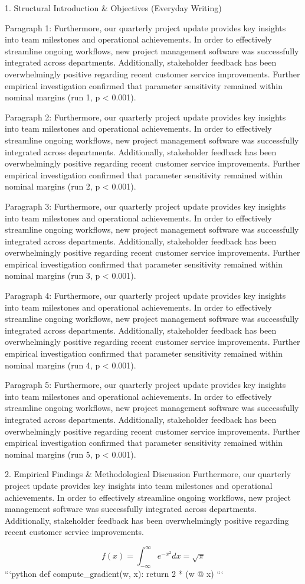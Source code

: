 1. Structural Introduction & Objectives (Everyday Writing)


Paragraph 1: Furthermore, our quarterly project update provides key insights into team milestones and operational achievements. In order to effectively streamline ongoing workflows, new project management software was successfully integrated across departments. Additionally, stakeholder feedback has been overwhelmingly positive regarding recent customer service improvements. Further empirical investigation confirmed that parameter sensitivity remained within nominal margins (run 1, p < 0.001).

Paragraph 2: Furthermore, our quarterly project update provides key insights into team milestones and operational achievements. In order to effectively streamline ongoing workflows, new project management software was successfully integrated across departments. Additionally, stakeholder feedback has been overwhelmingly positive regarding recent customer service improvements. Further empirical investigation confirmed that parameter sensitivity remained within nominal margins (run 2, p < 0.001).

Paragraph 3: Furthermore, our quarterly project update provides key insights into team milestones and operational achievements. In order to effectively streamline ongoing workflows, new project management software was successfully integrated across departments. Additionally, stakeholder feedback has been overwhelmingly positive regarding recent customer service improvements. Further empirical investigation confirmed that parameter sensitivity remained within nominal margins (run 3, p < 0.001).

Paragraph 4: Furthermore, our quarterly project update provides key insights into team milestones and operational achievements. In order to effectively streamline ongoing workflows, new project management software was successfully integrated across departments. Additionally, stakeholder feedback has been overwhelmingly positive regarding recent customer service improvements. Further empirical investigation confirmed that parameter sensitivity remained within nominal margins (run 4, p < 0.001).

Paragraph 5: Furthermore, our quarterly project update provides key insights into team milestones and operational achievements. In order to effectively streamline ongoing workflows, new project management software was successfully integrated across departments. Additionally, stakeholder feedback has been overwhelmingly positive regarding recent customer service improvements. Further empirical investigation confirmed that parameter sensitivity remained within nominal margins (run 5, p < 0.001).


2. Empirical Findings & Methodological Discussion
Furthermore, our quarterly project update provides key insights into team milestones and operational achievements. In order to effectively streamline ongoing workflows, new project management software was successfully integrated across departments. Additionally, stakeholder feedback has been overwhelmingly positive regarding recent customer service improvements.

$$ f(x) = \int_{-\infty}^{\infty} e^{-x^2} dx = \sqrt{\pi} $$ 
```python
def compute_gradient(w, x):
    return 2 * (w @ x)
```
